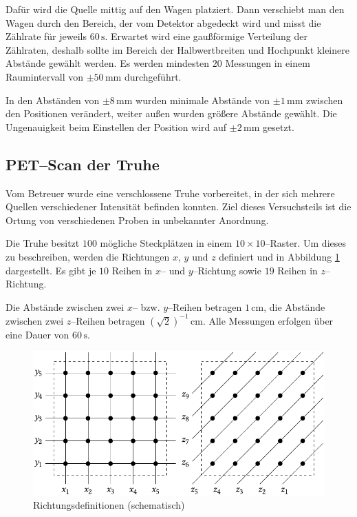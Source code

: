 \documentclass[12pt,a4paper]{scrartcl}
\numberwithin{equation}{section} %
\newcommand{\pu}[1]{\ensuremath{\mathrm{#1}}}
\begin{document}
Dafür wird die Quelle mittig auf den Wagen platziert. Dann verschiebt man den Wagen durch den Bereich, der vom Detektor abgedeckt wird und misst die Zählrate für jeweils $60\,\mathrm{s}$. Erwartet wird eine gaußförmige Verteilung der Zählraten, deshalb sollte im Bereich der Halbwertbreiten und Hochpunkt kleinere Abstände gewählt werden. Es werden mindesten $20$ Messungen in einem Raumintervall von $\pm 50\,\mathrm{mm}$ durchgeführt.

In den Abständen von $\pm 8\,\mathrm{mm}$ wurden minimale Abstände von $\pm 1\,\mathrm{mm}$ zwischen den Positionen verändert, weiter außen wurden größere Abstände gewählt. Die Ungenauigkeit beim Einstellen der Position wird auf $\pu{\pm 2\, mm}$ gesetzt.

\subsection{PET--Scan der Truhe}
Vom Betreuer wurde eine verschlossene Truhe vorbereitet, in der sich mehrere Quellen verschiedener Intensität befinden konnten.  Ziel dieses Versuchsteils ist die Ortung von verschiedenen Proben in unbekannter Anordnung.

Die Truhe besitzt $100$ mögliche Steckplätzen in einem $10\times10$--Raster. Um dieses zu beschreiben, werden die Richtungen $x$, $y$ und $z$ definiert und in Abbildung \ref{abb:TruheRichtungen} dargestellt. Es gibt je $10$ Reihen in $x$-- und $y$--Richtung sowie $19$ Reihen in $z$--Richtung.

Die Abstände zwischen zwei $x$-- bzw. $y$--Reihen betragen $\pu{1\,cm}$, die Abstände zwischen zwei $z$--Reihen betragen $(\sqrt{2})^{-1}\,\mathrm{cm}$. Alle Messungen erfolgen über eine Dauer von $60\,\mathrm{s}$.

\begin{figure}[h]
	\centering
	\includegraphics{../media/B3.4/Box_Axis.pdf}
	\caption{Richtungsdefinitionen (schematisch) \cite{UzK}}
	\label{abb:TruheRichtungen}
\end{figure}
\end{document}
